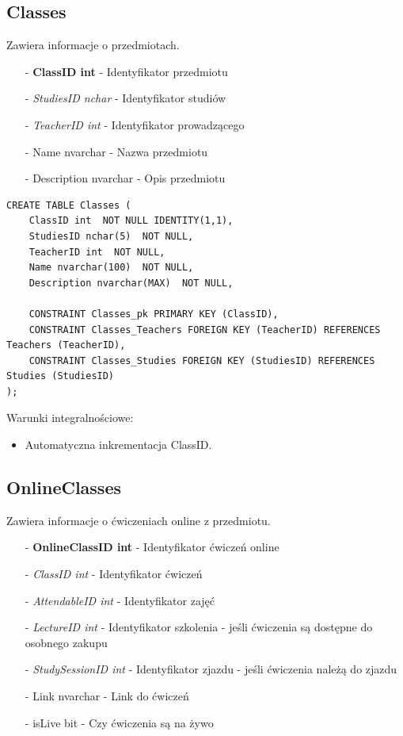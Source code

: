 \documentclass[11pt,a4paper]{article}
\begin{document}
\subsection{Classes}
Zawiera informacje o przedmiotach.

\begin{itemize}
    \item[-] \textbf{ClassID int} - Identyfikator przedmiotu
    \item[-] \textit{StudiesID nchar} - Identyfikator studiów
    \item[-] \textit{TeacherID int} - Identyfikator prowadzącego
    \item[-] Name nvarchar - Nazwa przedmiotu
    \item[-] Description nvarchar - Opis przedmiotu
\end{itemize}

\begin{Verbatim}[breaklines=true]
CREATE TABLE Classes (
    ClassID int  NOT NULL IDENTITY(1,1),
    StudiesID nchar(5)  NOT NULL,
    TeacherID int  NOT NULL,
    Name nvarchar(100)  NOT NULL,
    Description nvarchar(MAX)  NOT NULL,

    CONSTRAINT Classes_pk PRIMARY KEY (ClassID),
    CONSTRAINT Classes_Teachers FOREIGN KEY (TeacherID) REFERENCES Teachers (TeacherID),
    CONSTRAINT Classes_Studies FOREIGN KEY (StudiesID) REFERENCES Studies (StudiesID)
);
\end{Verbatim}

Warunki integralnościowe:
\begin{itemize}
    \item Automatyczna inkrementacja ClassID.
\end{itemize}

\subsection{OnlineClasses}
Zawiera informacje o ćwiczeniach online z przedmiotu.

\begin{itemize}
    \item[-] \textbf{OnlineClassID int} - Identyfikator ćwiczeń online
    \item[-] \textit{ClassID int} - Identyfikator ćwiczeń
    \item[-] \textit{AttendableID int} - Identyfikator zajęć
    \item[-] \textit{LectureID int} - Identyfikator szkolenia - jeśli ćwiczenia są dostępne do osobnego zakupu
    \item[-] \textit{StudySessionID int} - Identyfikator zjazdu - jeśli ćwiczenia należą do zjazdu
    \item[-] Link nvarchar - Link do ćwiczeń
    \item[-] isLive bit - Czy ćwiczenia są na żywo
\end{itemize}
\end{document}
